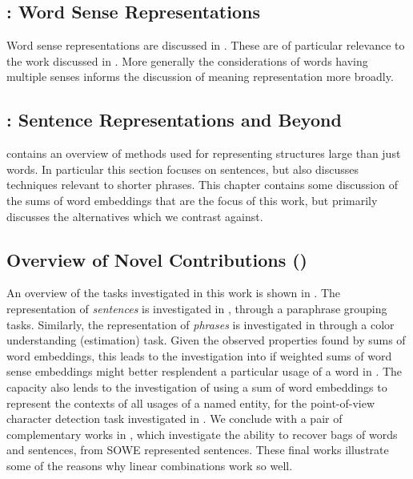 \documentclass{book}
\begin{document}
\subsection*{:  Word Sense Representations}
Word sense representations are discussed in .
These are of particular relevance to the work discussed in .
More generally the considerations of words having multiple senses informs the discussion of meaning representation more broadly.

\subsection*{:  Sentence Representations and Beyond}
 contains an overview of methods used for representing structures large than just words.
In particular this section focuses on sentences, but also discusses techniques relevant to shorter phrases.
This chapter contains some discussion of the sums of word embeddings that are the focus of this work,
but primarily discusses the alternatives which we contrast against.


\subsection*{Overview of Novel Contributions ()}
An overview of the tasks investigated in this work is shown in .
The representation of \emph{sentences} is investigated in , through a paraphrase grouping tasks.
Similarly, the representation of \emph{phrases} is investigated in  through a color understanding (estimation) task.
Given the observed properties found by sums of word embeddings,
this leads to the investigation into if weighted sums of word sense embeddings might better resplendent a particular usage of a word in .
The capacity also lends to the investigation of using a sum of word embeddings to represent the contexts of all usages of a named entity, for the point-of-view character detection task investigated in .
We conclude with a pair of complementary works in  , which investigate the ability to recover bags of words and sentences, from SOWE represented sentences.
These final works illustrate some of the reasons why linear combinations work so well.
\end{document}

